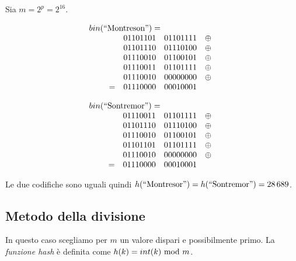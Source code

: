 \begin{eg}
    Sia $m=2^p=2^{16}$.\\
    \begin{minipage}[t]{0.48\textwidth}
        \vspace{-0.75cm}
        \[bin(\text{\q{Montreson}})=
        \hspace{-2.5cm}\begin{array}[t]{lccl}
            \\
            & 01101101 & 01101111 & \oplus\\
            & 01101110 & 01110100 & \oplus\\
            & 01110010 & 01100101 & \oplus\\
            & 01110011 & 01101111 & \oplus\\
            & 01110010 & 00000000 & \oplus\\
            = & 01110000 & 00010001
        \end{array}\]
    \end{minipage}
    \hfill
    \begin{minipage}[t]{0.48\textwidth}
        \vspace{-0.75cm}
        \[bin(\text{\q{Sontremor}})=
        \hspace{-2.5cm}\begin{array}[t]{lccl}
            \\
            & 01110011 & 01101111 & \oplus\\
            & 01101110 & 01110100 & \oplus\\
            & 01110010 & 01100101 & \oplus\\
            & 01101101 & 01101111 & \oplus\\
            & 01110010 & 00000000 & \oplus\\
            = & 01110000 & 00010001
        \end{array}\]
    \end{minipage}
    Le due codifiche sono uguali quindi $h(\text{``Montresor''})=h(\text
    {``Sontremor''})=28\,689$.
\end{eg}

\subsection{Metodo della divisione}
In questo caso scegliamo per $m$ un valore dispari e possibilmente primo. La
\emph{funzione hash} è definita come $h(k)=int(k)\ \mathrm{mod}\ m$.

